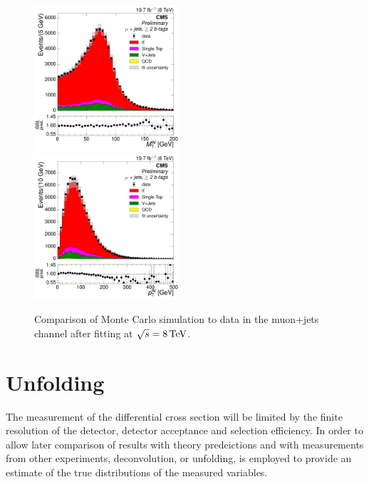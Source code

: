 \begin{figure}[hbtp]
     \includegraphics[width=0.48\textwidth]{Chapters/04_Analysis/04b_XSections/images/control_plots/after_fit/8TeV/MuPlusJets_patType1CorrectedPFMet_MT_2orMoreBtags_with_ratio.pdf}\\     
	 \includegraphics[width=0.48\textwidth]{Chapters/04_Analysis/04b_XSections/images/control_plots/after_fit/8TeV/MuPlusJets_patType1CorrectedPFMet_WPT_2orMoreBtags_with_ratio.pdf}\hfill
	 \caption{Comparison of Monte Carlo simulation to data in the muon+jets channel after fitting at
	 $\sqrt{s}=8\,\text{Te\hspace{-.08em}V}$.}
     \label{fig:data_mc_comparison_after_fit_8TeV_muon}
\end{figure}

\FloatBarrier


\section{Unfolding}
\label{ss:unfolding}

The measurement of the differential cross section will be limited by the finite resolution of the detector,
detector acceptance and selection efficiency. In order to allow later comparison of results with theory
predeictions and with measurements from other experiments, deconvolution, or unfolding, is employed to provide
an estimate of the true distributions of the measured variables.

